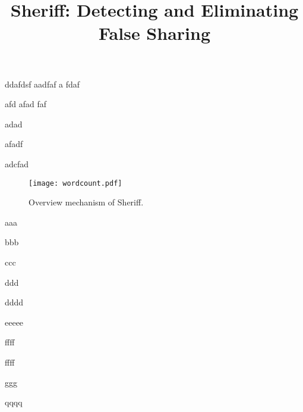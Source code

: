 \documentclass[10pt]{sigplanconf}
\begin{document}


\title{Sheriff: Detecting and Eliminating False Sharing}

\authorinfo{}

\maketitle
ddafdsf
aadfaf
a
fdaf

afd
afad
faf


adad

afadf

adcfad
\begin{figure*}[!t]
\centering
\texttt{[image: wordcount.pdf]}
\caption{Overview mechanism of Sheriff. }
\end{figure*}

aaa



bbb


ccc


ddd


dddd


eeeee


ffff


ffff


ggg


qqqq
\end{document}
